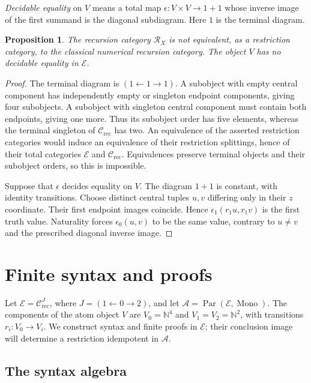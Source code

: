 \documentclass[11pt]{article}
\newtheorem{proposition}[theorem]{Proposition}
\newcommand{\N}{\mathbb N}
\begin{document}
\emph{Decidable equality} on $V$ means a total map
$\epsilon:V\times V\to1+1$ whose inverse image of the first
summand is the diagonal subdiagram. Here $1$ is the terminal diagram.

\begin{proposition}\label{prop:fork-distinction}
The recursion category $\mathscr R_X$ is not equivalent, as a
restriction category, to the classical numerical recursion category.
The object $V$ has no decidable equality in $\mathcal E$.
\end{proposition}
\begin{proof}
The terminal diagram is $(1\leftarrow1\to1)$. A subobject
with empty central component has independently empty or singleton
endpoint components, giving four subobjects. A subobject with
singleton central component must contain both endpoints, giving
one more. Thus its subobject order has five elements, whereas
the terminal singleton of $\mathcal C_{\mathrm{rec}}$ has two.
An equivalence of the asserted restriction categories would induce
an equivalence of their restriction splittings, hence of their
total categories $\mathcal E$ and $\mathcal C_{\mathrm{rec}}$.
Equivalences preserve terminal objects and their subobject orders,
so this is impossible.

Suppose that $\epsilon$ decides equality on $V$. The diagram $1+1$
is constant, with identity transitions. Choose distinct central
tuples $u,v$ differing only in their $z$ coordinate. Their first
endpoint images coincide. Hence $\epsilon_1(r_1u,r_1v)$ is the
first truth value. Naturality forces $\epsilon_0(u,v)$ to be
the same value, contrary to $u\ne v$ and the prescribed diagonal
inverse image.
\end{proof}

\section{Finite syntax and proofs}
\label{app:fork-proofs}

Let $\mathcal E=\mathcal C_{\mathrm{rec}}^{J}$, where
$J=(1\leftarrow0\to2)$, and let
$\mathcal A=\operatorname{Par}(\mathcal E,\operatorname{Mono})$.
The components of the atom object $V$ are $V_0=\N^4$ and
$V_1=V_2=\N^2$, with transitions $r_i:V_0\to V_i$.
We construct syntax and finite proofs in $\mathcal E$; their
conclusion image will determine a restriction idempotent in $\mathcal A$.

\subsection{The syntax algebra}
\end{document}
